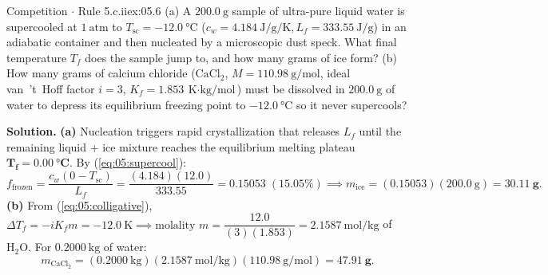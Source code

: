 \begin{workedexample}{Competition $\cdot$ Rule 5.c.ii}{ex:05.6}
(a) A $\SI{200.0}{\gram}$ sample of ultra-pure liquid water is supercooled at $\SI{1}{\text{atm}}$ to $T_{\mathrm{sc}} = -\SI{12.0}{\celsius}$ ($c_w = \SI{4.184}{\joule\per\gram\per\kelvin}, L_f = \SI{333.55}{\joule\per\gram}$) in an adiabatic container and then nucleated by a microscopic dust speck. What final temperature $T_f$ does the sample jump to, and how many grams of ice form?
(b) How many grams of calcium chloride ($\mathrm{CaCl_2}$, $M = \SI{110.98}{\gram\per\mole}$, ideal van~'t~Hoff factor $i = 3$, $K_f = \SI{1.853}{\kelvin\cdot\kilogram\per\mole}$) must be dissolved in $\SI{200.0}{\gram}$ of water to depress its equilibrium freezing point to $-\SI{12.0}{\celsius}$ so it never supercools?

\textbf{Solution.}
\textbf{(a)} Nucleation triggers rapid crystallization that releases $L_f$ until the remaining liquid + ice mixture reaches the equilibrium melting plateau $\mathbf{T_f = \SI{0.00}{\celsius}}$. By (\ref{eq:05:supercool}):
\[
  f_{\mathrm{frozen}} = \frac{c_w(0 - T_{\mathrm{sc}})}{L_f} = \frac{(4.184)(12.0)}{333.55} = \mathbf{0.15053\;(15.05\%)} \implies
  m_{\mathrm{ice}} = (0.15053)(\SI{200.0}{\gram}) = \mathbf{\SI{30.11}{\gram}}.
\]
\textbf{(b)} From (\ref{eq:05:colligative}), $\Delta T_f = -i K_f m = -\SI{12.0}{\kelvin} \implies \text{molality } m = \dfrac{12.0}{(3)(1.853)} = \SI{2.1587}{\mole\per\kilogram}$ of $\mathrm{H_2O}$. For $\SI{0.2000}{\kilogram}$ of water:
\[
  m_{\mathrm{CaCl_2}} = (\SI{0.2000}{\kilogram})(\SI{2.1587}{\mole\per\kilogram})(\SI{110.98}{\gram\per\mole}) = \mathbf{\SI{47.91}{\gram}}.
\]
\end{workedexample}

